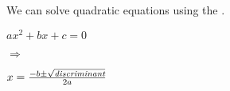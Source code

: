 We can solve quadratic equations using 
the  .

\hfill
\begin{minipage}{0.3\textwidth}
    \raggedleft
    \Large
    $ax^2 + bx + c = 0$
\end{minipage}
\hfill
{
    \huge $\Rightarrow$
}
\hfill
\begin{minipage}{0.3\textwidth}
    \raggedright
    \Large
    \(
        x = \frac
            {-b \pm \sqrt{\text{\itshape discriminant}}}
            {2a}
    \)
\end{minipage}
\hfill\,
